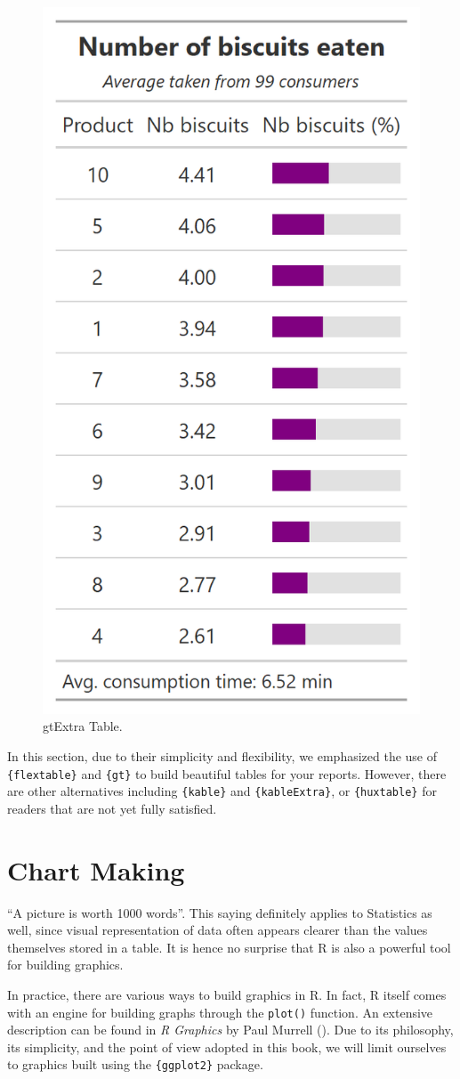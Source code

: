 \documentclass[
]{krantz}
\begin{document}
\begin{figure}

{\centering \includegraphics[width=0.4\linewidth]{images/gt_table_3} 

}

\caption{gtExtra Table.}\label{fig:gttextratable}
\end{figure}

In this section, due to their simplicity and flexibility, we emphasized the use of \texttt{\{flextable\}} and \texttt{\{gt\}} to build beautiful tables for your reports. However, there are other alternatives including \texttt{\{kable\}} and \texttt{\{kableExtra\}}, or \texttt{\{huxtable\}} for readers that are not yet fully satisfied.

\hypertarget{chart-making}{%
\section{Chart Making}\label{chart-making}}

``A picture is worth 1000 words''. This saying definitely applies to Statistics as well, since visual representation of data often appears clearer than the values themselves stored in a table. It is hence no surprise that R is also a powerful tool for building graphics.

In practice, there are various ways to build graphics in R. In fact, R itself comes with an engine for building graphs through the \texttt{plot()} function. An extensive description can be found in \emph{R Graphics} by Paul Murrell (\citet{Murrell2011}). Due to its philosophy, its simplicity, and the point of view adopted in this book, we will limit ourselves to graphics built using the \texttt{\{ggplot2\}} package.
\end{document}
